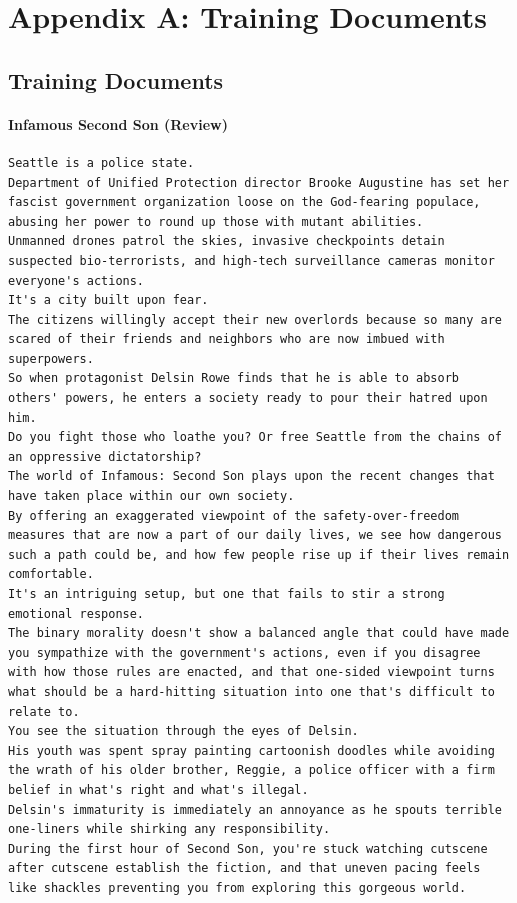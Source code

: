 \documentclass[BTech]{nitgoathesis}
\begin{document}
\chapter{Appendix A: Training Documents}
\section{Training Documents}

\subsubsection{Infamous Second Son (Review)}
\begin{lstlisting}[basicstyle=\scriptsize]
Seattle is a police state.
Department of Unified Protection director Brooke Augustine has set her fascist government organization loose on the God-fearing populace, abusing her power to round up those with mutant abilities.
Unmanned drones patrol the skies, invasive checkpoints detain suspected bio-terrorists, and high-tech surveillance cameras monitor everyone's actions.
It's a city built upon fear.
The citizens willingly accept their new overlords because so many are scared of their friends and neighbors who are now imbued with superpowers.
So when protagonist Delsin Rowe finds that he is able to absorb others' powers, he enters a society ready to pour their hatred upon him.
Do you fight those who loathe you? Or free Seattle from the chains of an oppressive dictatorship?
The world of Infamous: Second Son plays upon the recent changes that have taken place within our own society.
By offering an exaggerated viewpoint of the safety-over-freedom measures that are now a part of our daily lives, we see how dangerous such a path could be, and how few people rise up if their lives remain comfortable.
It's an intriguing setup, but one that fails to stir a strong emotional response.
The binary morality doesn't show a balanced angle that could have made you sympathize with the government's actions, even if you disagree with how those rules are enacted, and that one-sided viewpoint turns what should be a hard-hitting situation into one that's difficult to relate to.
You see the situation through the eyes of Delsin.
His youth was spent spray painting cartoonish doodles while avoiding the wrath of his older brother, Reggie, a police officer with a firm belief in what's right and what's illegal.
Delsin's immaturity is immediately an annoyance as he spouts terrible one-liners while shirking any responsibility.
During the first hour of Second Son, you're stuck watching cutscene after cutscene establish the fiction, and that uneven pacing feels like shackles preventing you from exploring this gorgeous world.

\end{lstlisting}
\end{document}
